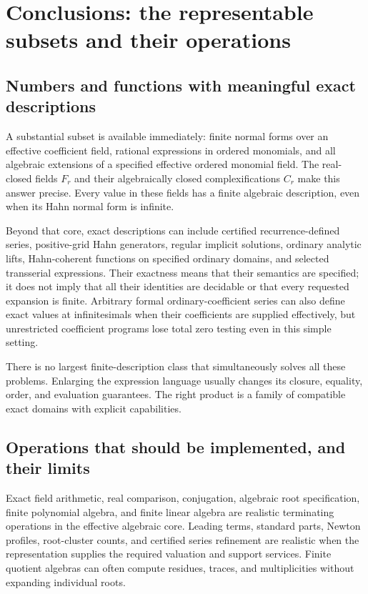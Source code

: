 \documentclass[11pt,letterpaper]{article}
\numberwithin{equation}{section}
\theoremstyle{definition}
\theoremstyle{remark}\newtheorem{remark}[theorem]{Remark}
\begin{document}
\section{Conclusions: the representable subsets and their operations}
\label{sec:conclusion}

\subsection{Numbers and functions with meaningful exact descriptions}
A substantial subset is available immediately: finite normal forms over an
effective coefficient field, rational expressions in ordered monomials, and
all algebraic extensions of a specified effective ordered monomial field.
The real-closed fields $F_r$ and their algebraically closed complexifications
$C_r$ make this answer precise. Every value in these fields has a finite
algebraic description, even when its Hahn normal form is infinite.

Beyond that core, exact descriptions can include certified recurrence-defined
series, positive-grid Hahn generators, regular implicit solutions, ordinary
analytic lifts, Hahn-coherent functions on specified ordinary domains, and
selected transserial expressions. Their exactness means that their semantics
are specified; it does not imply that all their identities are decidable or
that every requested expansion is finite. Arbitrary formal ordinary-coefficient
series can also define exact values at infinitesimals when their coefficients
are supplied effectively, but unrestricted coefficient programs lose total
zero testing even in this simple setting.

There is no largest finite-description class that simultaneously solves all
these problems. Enlarging the expression language usually changes its
closure, equality, order, and evaluation guarantees. The right product is a
family of compatible exact domains with explicit capabilities.

\subsection{Operations that should be implemented, and their limits}
Exact field arithmetic, real comparison, conjugation, algebraic root
specification, finite polynomial algebra, and finite linear algebra are
realistic terminating operations in the effective algebraic core. Leading
terms, standard parts, Newton profiles, root-cluster counts, and certified
series refinement are realistic when the representation supplies the required
valuation and support services. Finite quotient algebras can often compute
residues, traces, and multiplicities without expanding individual roots.
\end{document}
